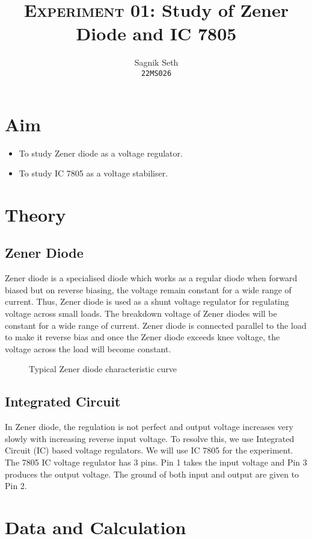 \documentclass{scrartcl}
\title{
        \Large\textsc{Experiment 01: }
        \huge\textbf{Study of Zener Diode and IC 7805} \\
}
\author{{\Large Sagnik Seth} \\ \texttt{22MS026}}
\date{}
\begin{document}
\maketitle
\section{Aim}
\begin{itemize}
        \item To study Zener diode as a voltage regulator.
        \item To study IC 7805 as a voltage stabiliser.
\end{itemize}

\section{Theory}
\subsection{Zener Diode}

Zener diode is a specialised diode which works as a regular diode when forward biased but on reverse biasing, the voltage remain constant for a wide range of current. Thus, Zener diode is used as a shunt voltage regulator for regulating voltage across small loads. The breakdown voltage of Zener diodes will be constant for a wide range of current. Zener diode is connected parallel to the load to make it reverse bias and once the Zener diode exceeds knee voltage, the voltage across the load will become constant.
\begin{figure}[H]
        \centering
        
        \caption{Typical Zener diode characteristic curve}
\end{figure}
\noindent
\subsection{Integrated Circuit}
In Zener diode, the regulation is not perfect and output
voltage increases very slowly with increasing reverse input voltage. To resolve this, we use Integrated Circuit (IC) based voltage regulators. We will use IC 7805 for the experiment.
The 7805 IC voltage regulator has
3 pins. Pin 1 takes the input voltage and Pin 3 produces the output
voltage. The ground of both input and output are given to Pin 2.


\section{Data and Calculation}
\end{document}
